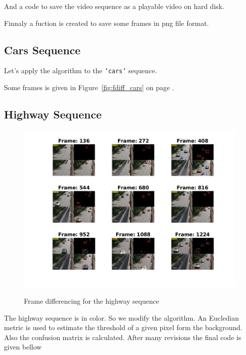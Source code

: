 \documentclass[a4paper,12pt]{article}
\begin{document}


And a code to save the video sequence as a playable video on hard disk.



Finnaly a fuction is created to save some frames in png file format.


\subsection{Cars Sequence}
Let's apply the algorithm to the \texttt{'cars'} sequence.


Some frames is given in Figure~\ref{fig:fdiff_cars} on page \pageref{fig:fdiff_cars}.


\subsection{Highway Sequence}

\begin{figure}[Ht]
\centering
\includegraphics{../Videos/highway_frame_diff.png}
\label{fig:fdiff_highway}
\caption{Frame differencing for the highway sequence}
\end{figure}

The highway sequence is in color. So we modify the algorithm. An Eucledian metric is used  to estimate the threshold of a given pixel form the background. Also the confusion matrix is calculated. After many revisions the final code is given bellow
\end{document}
